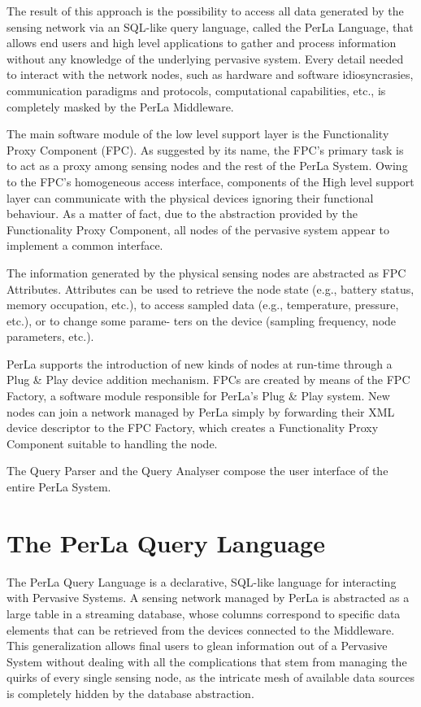 The result of this approach is the possibility to access all data generated by
the sensing network via an SQL-like query language, called the PerLa Language,
that allows end users and high level applications to gather and process
information without any knowledge of the underlying pervasive system. Every
detail needed to interact with the network nodes, such as hardware and software
idiosyncrasies, communication paradigms and protocols, computational
capabilities, etc., is completely masked by the PerLa Middleware.

The main software module of the low level support layer is the Functionality
Proxy Component (FPC). As suggested by its name, the FPC’s primary task is to
act as a proxy among sensing nodes and the rest of the PerLa System. Owing to
the FPC’s homogeneous access interface, components of the High level support
layer can communicate with the physical devices ignoring their functional
behaviour. As a matter of fact, due to the abstraction provided by the
Functionality Proxy Component, all nodes of the pervasive system appear to
implement a common interface.

The information generated by the physical sensing nodes are abstracted as FPC
Attributes. Attributes can be used to retrieve the node state (e.g., battery
status, memory occupation, etc.), to access sampled data (e.g., temperature,
pressure, etc.), or to change some parame- ters on the device (sampling
frequency, node parameters, etc.). 

PerLa supports the introduction of new
kinds of nodes at run-time through a Plug \& Play device addition mechanism.
FPCs are created by means of the FPC Factory, a software module responsible for
PerLa’s Plug \& Play system. New nodes can join a network managed by PerLa
simply by forwarding their XML device descriptor to the FPC Factory, which
creates a Functionality Proxy Component suitable to handling the node.

The Query Parser and the Query Analyser compose the user interface of the
entire PerLa System.

\section{The PerLa Query Language}

The PerLa Query Language is a declarative, SQL-like language for interacting
with Pervasive Systems. A sensing network managed by PerLa is abstracted as a
large table in a streaming database, whose columns correspond to specific data
elements that can be retrieved from the devices connected to the Middleware.
This generalization allows final users to glean information out of a Pervasive
System without dealing with all the complications that stem from managing the
quirks of every single sensing node, as the intricate mesh of available data
sources is completely hidden by the database abstraction.

